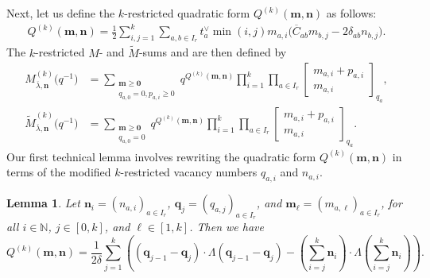 \documentclass[pdftex]{sigma}
\numberwithin{equation}{section}
\newtheorem{Lemma}[Theorem]{Lemma}
\begin{document}
Next, let us define the $k$-restricted quadratic form $Q^{(k)}(\mathbf{m},\mathbf{n})$ as follows:
\begin{gather*}
Q^{(k)}(\mathbf{m},\mathbf{n})=\frac{1}{2}\sum_{i,j=1}^k \sum_{a,b\in I_r}t_a^{\vee}\min(i,j)m_{a,i}\bigl(\overline{ C}_{ab}m_{b,j} -2\delta_{ab}n_{b,j}\bigr).
\end{gather*}
The $k$-restricted $M$- and $\tilde{M}$-sums  and  are then defined by
\begin{align}
M_{\overline{\lambda},\mathbf{n}}^{(k)}\bigl(q^{-1}\bigr)
&=\sum_{\substack{\mathbf{m}\geq\mathbf{0}\\q_{a,0}=0,p_{a,i}\geq0}}q^{Q^{(k)}(\mathbf{m},\mathbf{n})}\prod_{i=1}^k\prod_{a \in I_r}\begin{bmatrix}m_{a,i}+p_{a,i}\\m_{a,i} \end{bmatrix}_{q_a},\nonumber\\
\tilde{M}_{\overline{\lambda},\mathbf{n}}^{(k)}\bigl(q^{-1}\bigr)
&=\sum_{\substack{\mathbf{m}\geq\mathbf{0}\\q_{a,0}=0}}q^{Q^{(k)}(\mathbf{m},\mathbf{n})}\prod_{i=1}^k\prod_{a\in I_r}
\begin{bmatrix}m_{a,i}+p_{a,i}\\m_{a,i}\end{bmatrix}_{q_a}.\label{eq:4.11}
\end{align}
Our first technical lemma involves rewriting the quadratic form $Q^{(k)}(\mathbf{m},\mathbf{n})$ in terms of the modified $k$-restricted vacancy numbers $q_{a,i}$ and $n_{a,i}$.
\begin{Lemma}\label{4.4}
Let $\mathbf{n}_i=(n_{a,i})_{a\in I_r}$, $\mathbf{q}_j=(q_{a,j})_{a\in I_r}$, and $\mathbf{m}_{\ell}=(m_{a,\ell})_{a\in I_r}$, for all $i\in\mathbb{N}$, $j\in[0,k]$, and $\ell\in[1,k]$. Then we have
\begin{equation*}
Q^{(k)}(\mathbf{m},\mathbf{n})=\frac{1}{2\delta}\sum_{j=1}^k \left((\mathbf{q}_{j-1}-\mathbf{q}_j)\cdot\Lambda(\mathbf{ q}_{j-1}-\mathbf{q}_j)-\left(\sum_{i=j}^k\mathbf{n}_i\right) \cdot\Lambda\left(\sum_{i=j}^k\mathbf{n}_i\right)\right).
\end{equation*}
\end{Lemma}
\end{document}
